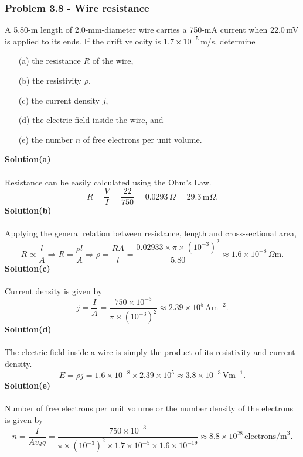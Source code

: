 \documentclass{article}
\begin{document}
\subsubsection*{Problem 3.8 - Wire resistance}
A 5.80-m length of 2.0-mm-diameter wire carries a 
750-mA current when 22.0\,mV is applied to its ends. If the
drift velocity is $1.7\times10^{-5}\,$m/s, determine
\begin{enumerate}
    \item[(a)]the resistance $R$ of the wire,
    \item[(b)]the resistivity $\rho$,
    \item[(c)]the current density $j$,
    \item[(d)] the electric field inside the wire, and 
    \item[(e)] the number $n$ of free electrons per unit volume.
\end{enumerate}
\textbf{Solution(a)}
\\
\\Resistance can be easily calculated using the Ohm's Law.
\[R=\frac{V}{I}=\frac{22}{750}=0.0293\,\Omega=29.3\,\text{m}\Omega.\]
\textbf{Solution(b)}
\\
\\Applying the general relation between resistance, length and cross-sectional area,
\[R\propto\frac{l}{A}\Rightarrow R=\frac{\rho l}{A}\Rightarrow\rho=\frac{RA}{l}=\frac{0.02933\times\pi\times(10^{-3})^2}{5.80}\approx1.6\times10^{-8}\,\Omega\text{m}.\]
\textbf{Solution(c)}
\\
\\Current density is given by
\[j=\frac{I}{A}=\frac{750\times10^{-3}}{\pi\times(10^{-3})^2}\approx2.39\times10^5\,\text{Am}^{-2}.\]
\textbf{Solution(d)}
\\
\\The electric field inside a wire is simply the product of its resistivity and current density.
\[E=\rho j=1.6\times10^{-8}\times2.39\times10^5\approx3.8\times10^{-3}\,\text{Vm}^{-1}.\]
\textbf{Solution(e)}
\\
\\Number of free electrons per unit volume or the number density of the electrons is given by
\[n=\frac{I}{Av_dq}=\frac{750\times10^{-3}}{\pi\times(10^{-3})^2\times1.7\times10^{-5}\times1.6\times10^{-19}}\approx8.8\times10^{28}\,\text{electrons/m}^3.\]
\end{document}

